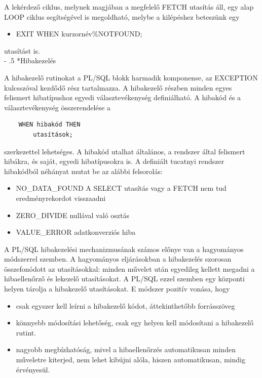 \documentclass[tikz,12pt,margin=0px]{article}
\makeatletter
\renewcommand\paragraph{%
	\@startsection{paragraph}{4}{0mm}%
	{-\baselineskip}%
	{.5\baselineskip}%
	{\normalfont\normalsize\bfseries}}
\makeatother
\begin{document}
    \noindent A lekérdező ciklus, melynek magjában a megfelelő FETCH utasítás áll, egy alap LOOP ciklus segítségével is megoldható, melybe a kilépéshez beteszünk egy
    \begin{itemize}
        \item EXIT WHEN kurzornév\%NOTFOUND;
    \end{itemize}
    utasítást is.\\

    \paragraph*{Hibakezelés\\}

    \noindent A hibakezelő rutinokat a PL/SQL blokk harmadik komponense, az EXCEPTION kulcsszóval kezdődő rész tartalmazza. A hibakezelő részben minden egyes felismert hibatípushoz egyedi választevékenység definiálható. A hibakód és a választevékenység összerendelése a
    \begin{verbatim}
    WHEN hibakód THEN
        utasítások;
    \end{verbatim}
    szerkezettel lehetséges. A hibakód utalhat általános, a rendszer által felismert hibákra, és saját, egyedi hibatípusokra is. A definiált tucatnyi rendszer hibakódból néhányat mutat be az alábbi felsorolás:
    \begin{itemize}
	   \item NO\_DATA\_FOUND 	A SELECT utasítás vagy a FETCH nem tud eredményrekordot visszaadni
	   \item ZERO\_DIVIDE		nullával való osztás
	   \item VALUE\_ERROR		adatkonverziós hiba
    \end{itemize}

    \noindent A PL/SQL hibakezelési mechanizmusának számos előnye van a hagyományos módszerrel szemben. A hagyományos eljárásokban a hibakezelés szorosan összefonódott az utasításokkal: minden művelet után egyedileg kellett megadni a hibaellenőrző és lekezelő utasításokat. A PL/SQL ezzel szemben egy központi helyen tárolja a hibakezelő utasításokat. E módszer pozitív vonása, hogy
    \begin{itemize}
    	\item csak egyszer kell leírni a hibakezelő kódot, áttekinthetőbb forrásszöveg
    	\item könnyebb módosítási lehetőség, csak egy helyen kell módosítani a	hibakezelő rutint.
    	\item nagyobb megbízhatóság, mivel a hibaellenőrzés automatikusan minden műveletre kiterjed, nem lehet kibújni alóla, hiszen automatikusan, mindig érvényesül.
    \end{itemize}
\end{document}
